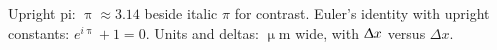 \documentclass{article}
\begin{document}
Upright pi: $\uppi \approx 3.14$ beside italic $\pi$ for contrast.
Euler's identity with upright constants: $e^{i\uppi} + 1 = 0$.
Units and deltas: $\upmu\mathrm{m}$ wide, with $\Updelta x$ versus $\Delta x$.
\end{document}
